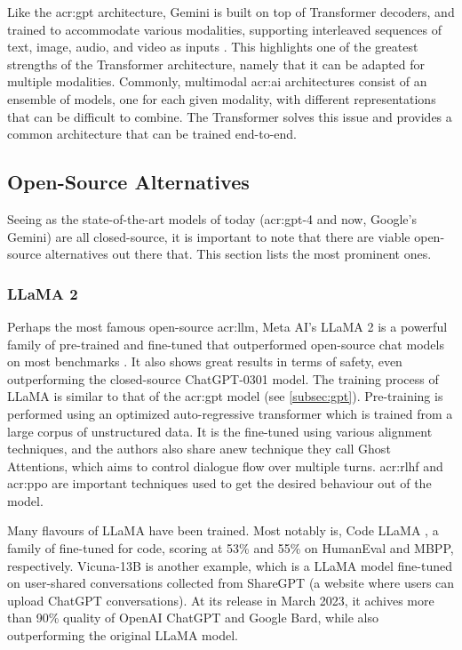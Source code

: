 Like the \acrshort{acr:gpt} architecture, Gemini is built on top of Transformer decoders, and trained to accommodate various modalities, supporting interleaved sequences of text, image, audio, and video as inputs \citep[3-4]{geminiteamGeminiFamilyHighly2023}. This highlights one of the greatest strengths of the Transformer architecture, namely that it can be adapted for multiple modalities. Commonly, multimodal \acrshort{acr:ai} architectures consist of an ensemble of models, one for each given modality, with different representations that can be difficult to combine. The Transformer solves this issue and provides a common architecture that can be trained end-to-end.

\subsection{Open-Source Alternatives}\label{subsec:open-source-llms}

Seeing as the state-of-the-art models of today (\acrshort{acr:gpt}-4 and now, Google's Gemini) are all closed-source, it is important to note that there are viable open-source alternatives out there that. This section lists the most prominent ones.

\subsubsection{LLaMA 2}

Perhaps the most famous open-source \acrshort{acr:llm}, Meta AI's LLaMA 2 is a powerful family of pre-trained and fine-tuned  that outperformed open-source chat models on most benchmarks \cite{touvronLlamaOpenFoundation2023a}. It also shows great results in terms of safety, even outperforming the closed-source ChatGPT-0301 model. The training process of LLaMA is similar to that of the \acrshort{acr:gpt} model (see \autoref{subsec:gpt}). Pre-training is performed using an optimized auto-regressive transformer which is trained from a large corpus of unstructured data. It is the fine-tuned using  various alignment techniques, and the authors also share anew technique they call Ghost Attentions, which aims to control dialogue flow over multiple turns. \gls{acr:rlhf} and \acrfull{acr:ppo} are important techniques used to get the desired behaviour out of the model.

Many flavours of LLaMA have been trained. Most notably is, Code LLaMA \citep{roziereCodeLlamaOpen2023}, a family of  fine-tuned for code, scoring at 53\% and 55\% on HumanEval and MBPP, respectively. Vicuna-13B is another example, which is a LLaMA model fine-tuned on user-shared conversations collected from ShareGPT (a website where users can upload ChatGPT conversations). At its release in March 2023, it achives more than 90\% quality of OpenAI ChatGPT and Google Bard, while also outperforming the original LLaMA model.

